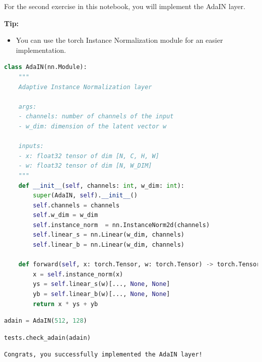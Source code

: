 For the second exercise in this notebook, you will implement the AdaIN
layer.

\textbf{Tip:}

\begin{itemize}
\item You can use the torch Instance Normalization module for an easier implementation.
\end{itemize}

\begin{lstlisting}[language=Python]
class AdaIN(nn.Module):
    """
    Adaptive Instance Normalization layer
    
    args:
    - channels: number of channels of the input
    - w_dim: dimension of the latent vector w
    
    inputs:
    - x: float32 tensor of dim [N, C, H, W]
    - w: float32 tensor of dim [N, W_DIM]
    """
    def __init__(self, channels: int, w_dim: int):
        super(AdaIN, self).__init__()
        self.channels = channels
        self.w_dim = w_dim
        self.instance_norm  = nn.InstanceNorm2d(channels)
        self.linear_s = nn.Linear(w_dim, channels)
        self.linear_b = nn.Linear(w_dim, channels)
        
    def forward(self, x: torch.Tensor, w: torch.Tensor) -> torch.Tensor:
        x = self.instance_norm(x)       
        ys = self.linear_s(w)[..., None, None]
        yb = self.linear_b(w)[..., None, None]
        return x * ys + yb
\end{lstlisting}

\begin{lstlisting}[language=Python]
adain = AdaIN(512, 128)
\end{lstlisting}

\begin{lstlisting}[language=Python]
tests.check_adain(adain)
\end{lstlisting}

\begin{lstlisting}
Congrats, you successfully implemented the AdaIN layer!
\end{lstlisting}
